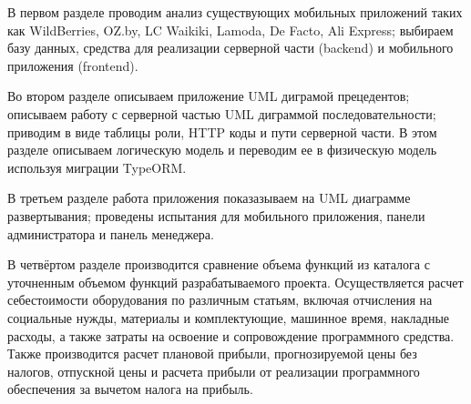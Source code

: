 В первом разделе
проводим анализ существующих мобильных приложений таких как
WildBerries, OZ.by, LC Waikiki, Lamoda, De Facto, Ali Express;
выбираем базу данных, средства для реализации серверной части (backend) и мобильного приложения (frontend).

Во втором разделе
описываем приложение UML диграмой прецедентов;
описываем работу с серверной частью UML диграммой последовательности;
приводим в виде таблицы роли, HTTP коды и пути серверной части. 
В этом разделе описываем логическую модель и переводим ее в физическую модель используя миграции TypeORM.

В третьем разделе
работа приложения показазываем на UML диаграмме развертывания;
проведены испытания для мобильного приложения, панели администратора и панель менеджера.

В четвёртом разделе
производится сравнение объема функций из каталога с уточненным объемом функций разрабатываемого проекта.
Осуществляется расчет себестоимости оборудования по различным статьям,
включая отчисления на социальные нужды, материалы и комплектующие,
машинное время, накладные расходы, а также затраты на освоение и сопровождение программного средства.
Также производится расчет плановой прибыли, прогнозируемой цены без налогов, отпускной цены и
расчета прибыли от реализации программного обеспечения за вычетом налога на прибыль.





